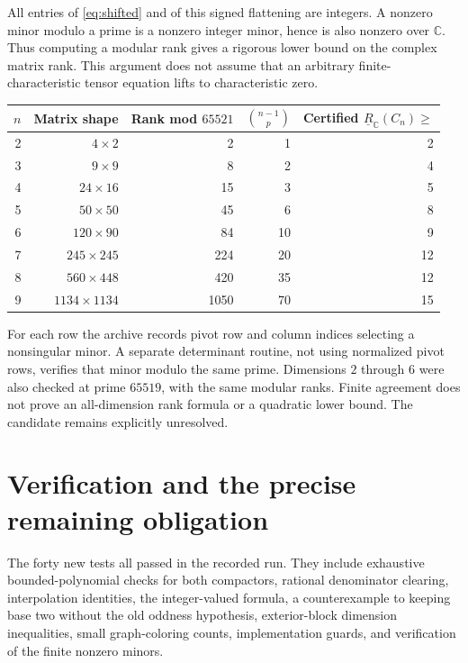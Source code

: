 \documentclass[11pt]{article}
\theoremstyle{definition}
\theoremstyle{remark}
\newcommand{\C}{\mathbb C}
\newcommand{\BR}{\underline R_{\C}}
\begin{document}
All entries of \eqref{eq:shifted} and of this signed flattening are integers. A nonzero minor modulo a prime is a nonzero integer minor, hence is also nonzero over $\C$. Thus computing a modular rank gives a rigorous lower bound on the complex matrix rank. This argument does not assume that an arbitrary finite-characteristic tensor equation lifts to characteristic zero.

\begin{center}
\begin{tabular}{rrrrr}
\toprule
$n$ & Matrix shape & Rank mod $65521$ & $\binom{n-1}p$ & Certified $\BR(C_n)\ge$\\
\midrule
2 & $4\times2$ & 2 & 1 & 2\\
3 & $9\times9$ & 8 & 2 & 4\\
4 & $24\times16$ & 15 & 3 & 5\\
5 & $50\times50$ & 45 & 6 & 8\\
6 & $120\times90$ & 84 & 10 & 9\\
7 & $245\times245$ & 224 & 20 & 12\\
8 & $560\times448$ & 420 & 35 & 12\\
9 & $1134\times1134$ & 1050 & 70 & 15\\
\bottomrule
\end{tabular}
\end{center}

For each row the archive records pivot row and column indices selecting a nonsingular minor. A separate determinant routine, not using normalized pivot rows, verifies that minor modulo the same prime. Dimensions $2$ through $6$ were also checked at prime $65519$, with the same modular ranks. Finite agreement does not prove an all-dimension rank formula or a quadratic lower bound. The candidate remains explicitly unresolved.

\section{Verification and the precise remaining obligation}\label{sec:status}

The forty new tests all passed in the recorded run. They include exhaustive bounded-polynomial checks for both compactors, rational denominator clearing, interpolation identities, the integer-valued formula, a counterexample to keeping base two without the old oddness hypothesis, exterior-block dimension inequalities, small graph-coloring counts, implementation guards, and verification of the finite nonzero minors.
\end{document}
